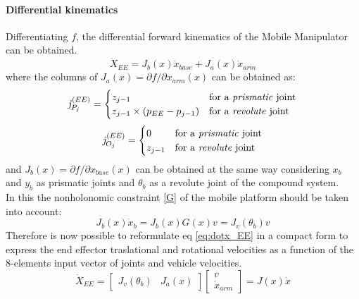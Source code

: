 \paragraph{Differential kinematics}Differentiating $f$, the differential forward kinematics of the Mobile Manipulator can be obtained. 
\begin{equation}\label{eq:dotx_EE}
	\dot{X}_{EE}=J_b(x)\dot{x}_{base}+J_a(x)\dot{x}_{arm}
\end{equation}
where the columns of $J_a(x)={\partial f}/{\partial x_{arm}}(x)$ can be obtained as:
\begin{equation}
\mathit{j}_{P_j}^{(EE)}=
	\begin{cases}
	z_{j-1} & \text{for a \textit{prismatic} joint} \\
	z_{j-1}\times \left(p_{EE}-p_{j-1}\right) & \text{for a \textit{revolute} joint}	
	\end{cases}                                             
\end{equation}
\begin{equation}
	\mathit{j}_{O_j}^{(EE)}= 
	\begin{cases}
	0 & \text{for a \textit{prismatic} joint} \\
	z_{j-1} & \text{for a \textit{revolute} joint}	
	\end{cases} 
\end{equation}
and $J_b(x)={\partial f}/{\partial x_{base}}(x)$ can be obtained at the same way considering $x_b$ and $y_b$ as prismatic joints and $\theta_b$ as a revolute joint of the compound system.\\
In this the nonholonomic constraint \ref{G} of the mobile platform should be taken into account:
\begin{equation}
	J_b(x)\dot{x}_b=J_b(x)G(x)v=J_v(\theta_b)v
\end{equation}
Therefore is now possible to reformulate eq \ref{eq:dotx_EE} in a compact form to express the end effector traslational and rotational velocities as a function of the 8-elements input vector of joints and vehicle velocities.
\begin{equation}
\dot{X}_{EE}=\left[\begin{matrix}
J_v(\theta_b) & J_a(x)
\end{matrix}\right]\left[\begin{matrix}v\\\dot{x}_{arm} \end{matrix}\right] = J(x)\dot{x}
\end{equation}

